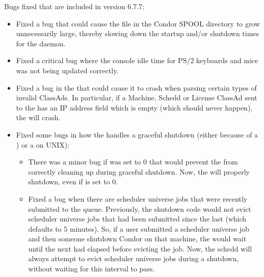 %
%
%

\noindent Bugs fixed that are included in version 6.7.7:

\begin{itemize}

\item Fixed a bug that could cause the file  in
	the Condor SPOOL directory to grow unnecessarily large, thereby
	slowing down the startup and/or shutdown times for the 
	daemon.

\item Fixed a critical bug where the console idle time for PS/2 keyboards
	and mice was not being updated correctly.

\item Fixed a bug in the  that could cause it to
crash when parsing certain types of invalid ClassAds.  In particular, if
a Machine, Schedd or License ClassAd sent to the  has
an IP address field which is empty (which should never happen), the
 will crash.

\item Fixed some bugs in how the  handles a graceful
  shutdown (either because of a ) or a \verb@SIGTERM@ on
  UNIX): 
\begin{itemize}
  \item There was a minor bug if  was set to
     0 that would prevent the  from correctly cleaning
     up during graceful shutdown.
     Now, the  will properly shutdown, even if
      is set to 0.

  \item Fixed a bug when there are scheduler universe jobs that were
    recently submitted to the queue.
    Previously, the shutdown code would not evict scheduler universe
    jobs that had been submitted since the last
     (which defaults to 5 minutes).
    So, if a user submitted a scheduler universe job and then someone
    shutdown Condor on that machine, the  would wait
    until the next  had elapsed before
    evicting the job.
    Now, the schedd will always attempt to evict scheduler universe
    jobs during a shutdown, without waiting for this interval to pass.
\end{itemize}


\end{itemize}
